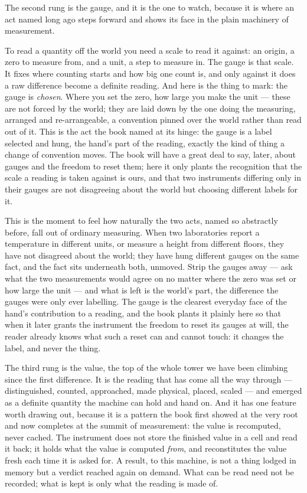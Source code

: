 The second rung is the gauge, and it is the one to watch, because it is where an act named long ago steps
forward and shows its face in the plain machinery of measurement.

To read a quantity off the world you need a scale to read it against: an origin, a zero to measure from, and a
unit, a step to measure in. The gauge is that scale. It fixes where counting starts and how big one count is,
and only against it does a raw difference become a definite reading. And here is the thing to mark: the gauge is
\emph{chosen}. Where you set the zero, how large you make the unit --- these are not forced by the world; they
are laid down by the one doing the measuring, arranged and re-arrangeable, a convention pinned over the world
rather than read out of it. This is the act the book named at its hinge: the gauge is a label selected and hung,
the hand's part of the reading, exactly the kind of thing a change of convention moves. The book will have a
great deal to say, later, about gauges and the freedom to reset them; here it only plants the recognition that
the scale a reading is taken against is ours, and that two instruments differing only in their gauges are not
disagreeing about the world but choosing different labels for it.

This is the moment to feel how naturally the two acts, named so abstractly before, fall out of ordinary
measuring. When two laboratories report a temperature in different units, or measure a height from different
floors, they have not disagreed about the world; they have hung different gauges on the same fact, and the fact
sits underneath both, unmoved. Strip the gauges away --- ask what the two measurements would agree on no matter
where the zero was set or how large the unit --- and what is left is the world's part, the difference the gauges
were only ever labelling. The gauge is the clearest everyday face of the hand's contribution to a reading, and
the book plants it plainly here so that when it later grants the instrument the freedom to reset its gauges at
will, the reader already knows what such a reset can and cannot touch: it changes the label, and never the thing.

The third rung is the value, the top of the whole tower we have been climbing since the first difference. It is
the reading that has come all the way through --- distinguished, counted, approached, made physical, placed,
scaled --- and emerged as a definite quantity the machine can hold and hand on. And it has one feature worth
drawing out, because it is a pattern the book first showed at the very root and now completes at the summit of
measurement: the value is recomputed, never cached. The instrument does not store the finished value in a cell
and read it back; it holds what the value is computed \emph{from}, and reconstitutes the value fresh each time it
is asked for. A result, to this machine, is not a thing lodged in memory but a verdict reached again on demand.
What can be read need not be recorded; what is kept is only what the reading is made of.

